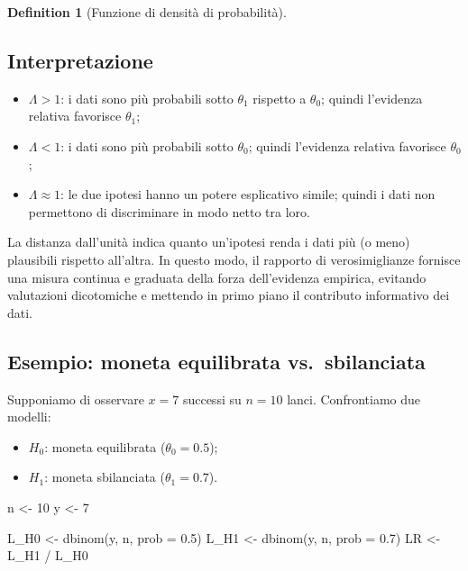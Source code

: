 \documentclass[
  letterpaper,
  DIV=11,
  numbers=noendperiod,
  oneside]{scrreprt}
\newenvironment{Shaded}{\begin{snugshade}}{\end{snugshade}}
\newcommand{\AttributeTok}[1]{\textcolor[rgb]{0.40,0.45,0.13}{#1}}
\newcommand{\DecValTok}[1]{\textcolor[rgb]{0.68,0.00,0.00}{#1}}
\newcommand{\FloatTok}[1]{\textcolor[rgb]{0.68,0.00,0.00}{#1}}
\newcommand{\FunctionTok}[1]{\textcolor[rgb]{0.28,0.35,0.67}{#1}}
\newcommand{\NormalTok}[1]{\textcolor[rgb]{0.00,0.23,0.31}{#1}}
\newcommand{\OtherTok}[1]{\textcolor[rgb]{0.00,0.23,0.31}{#1}}
\newcommand{\SpecialCharTok}[1]{\textcolor[rgb]{0.37,0.37,0.37}{#1}}
\providecommand{\tightlist}{%
  \setlength{\itemsep}{0pt}\setlength{\parskip}{0pt}}
\theoremstyle{definition}
\theoremstyle{plain}
\theoremstyle{definition}
\newtheorem{definition}{Definition}[chapter]
\theoremstyle{remark}
\begin{document}
\begin{definition}[Funzione di densità di
probabilità]
\subsection{Interpretazione}\label{interpretazione}

\begin{itemize}
\tightlist
\item
  \textbf{\(\Lambda > 1\)}: i dati sono più probabili sotto \(\theta_1\)
  rispetto a \(\theta_0\); quindi l'evidenza relativa favorisce
  \(\theta_1\);
\item
  \textbf{\(\Lambda < 1\)}: i dati sono più probabili sotto
  \(\theta_0\); quindi l'evidenza relativa favorisce \(\theta_0\);
\item
  \textbf{\(\Lambda \approx 1\)}: le due ipotesi hanno un potere
  esplicativo simile; quindi i dati non permettono di discriminare in
  modo netto tra loro.
\end{itemize}

La distanza dall'unità indica quanto un'ipotesi renda i dati più (o
meno) plausibili rispetto all'altra. In questo modo, il rapporto di
verosimiglianze fornisce una misura continua e graduata della forza
dell'evidenza empirica, evitando valutazioni dicotomiche e mettendo in
primo piano il contributo informativo dei dati.

\subsection{Esempio: moneta equilibrata
vs.~sbilanciata}\label{esempio-moneta-equilibrata-vs.-sbilanciata}

Supponiamo di osservare \(x = 7\) successi su \(n = 10\) lanci.
Confrontiamo due modelli:

\begin{itemize}
\tightlist
\item
  \(H_0\): moneta equilibrata (\(\theta_0 = 0.5\));
\item
  \(H_1\): moneta sbilanciata (\(\theta_1 = 0.7\)).
\end{itemize}

\begin{Shaded}
\begin{Highlighting}[]
\NormalTok{n }\OtherTok{\textless{}{-}} \DecValTok{10}
\NormalTok{y }\OtherTok{\textless{}{-}} \DecValTok{7}

\NormalTok{L\_H0 }\OtherTok{\textless{}{-}} \FunctionTok{dbinom}\NormalTok{(y, n, }\AttributeTok{prob =} \FloatTok{0.5}\NormalTok{)}
\NormalTok{L\_H1 }\OtherTok{\textless{}{-}} \FunctionTok{dbinom}\NormalTok{(y, n, }\AttributeTok{prob =} \FloatTok{0.7}\NormalTok{)}
\NormalTok{LR }\OtherTok{\textless{}{-}}\NormalTok{ L\_H1 }\SpecialCharTok{/}\NormalTok{ L\_H0}


\end{Highlighting}
\end{Shaded}
\end{definition}
\end{document}
